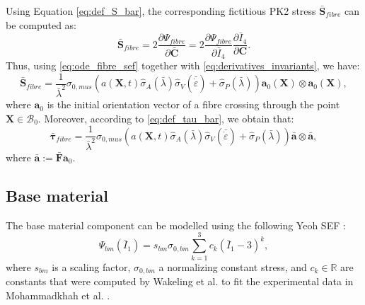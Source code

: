 \documentclass{sfuthesis}
\numberwithin{equation}{section}
\numberwithin{figure}{chapter}
\numberwithin{table}{chapter}
\theoremstyle{definition}
\def\*#1{{\mathbf{#1}}} %
\newcommand{\pder}[2]{\dfrac{\partial #1}{\partial #2}}
\newcommand{\depsilon}{\dot{\varepsilon}}
\newcommand{\R}{\mathbb{R}}
\newcommand{\B}{\mathcal{B}}
\newcommand{\I}{{\bar{I}}}
\def\btau{{\bm{\tau}}}
\begin{document}

Using Equation \eqref{eq:def_S_bar}, the corresponding fictitious PK2 stress $\bar{\*S}_{fibre}$ can be computed as:
\begin{equation}
    \bar{\*S}_{fibre} = 2 \pder{\Psi_{fibre}}{\bar{\*C}} = 2 \pder{\Psi_{fibre}}{\I_4} \pder{\I_4}{\*C}.
\end{equation}
Thus, using \eqref{eq:ode_fibre_sef} together with \eqref{eq:derivatives_invariants}, we have:
\begin{equation} \label{eq:def_S_fibre}
    \bar{\*S}_{fibre} = \dfrac{1}{\bar{\lambda}^2} \sigma_{0,mus} \left( a(\*X,t) \widehat{\sigma}_A(\bar{\lambda}) \widehat{\sigma}_V(\bar{\depsilon}) + \widehat{\sigma}_P(\bar{\lambda}) \right) \*a_0(\*X) \otimes \*a_0(\*X),
\end{equation}
where $\*a_0$ is the initial orientation vector of a fibre crossing through the point $\*X \in \B_0$. Moreover, according to \eqref{eq:def_tau_bar}, we obtain that:
\begin{equation}
    \bar{\btau}_{fibre} = \dfrac{1}{\bar{\lambda}^2} \sigma_{0,mus} \left( a(\*X,t) \widehat{\sigma}_A(\bar{\lambda}) \widehat{\sigma}_V(\bar{\depsilon}) + \widehat{\sigma}_P(\bar{\lambda}) \right) \bar{\*a} \otimes \bar{\*a},
\end{equation}
where $\bar{\*a} := \bar{\*F}\*a_0$.

\subsection{Base material}

The base material component can be modelled using the following Yeoh SEF \cite{Paper3_RossEtAl2021, Paper2_RyanEtAl2020, Paper1_WakelingEtAl2020}:
\begin{equation}\label{eq:def_Psi_bm}
    \Psi_{bm}(\I_1) = s_{bm} \sigma_{0,bm} \sum_{k=1}^3 c_k (\I_1 - 3)^k,
\end{equation}
where $s_{bm}$ is a scaling factor, $\sigma_{0,bm}$ a normalizing constant stress, and $c_k \in \R$ are constants that were computed by Wakeling et al. \cite{Paper1_WakelingEtAl2020} to fit the experimental data in Mohammadkhah et al. \cite{Mohammadkhah2016}.
\end{document}

